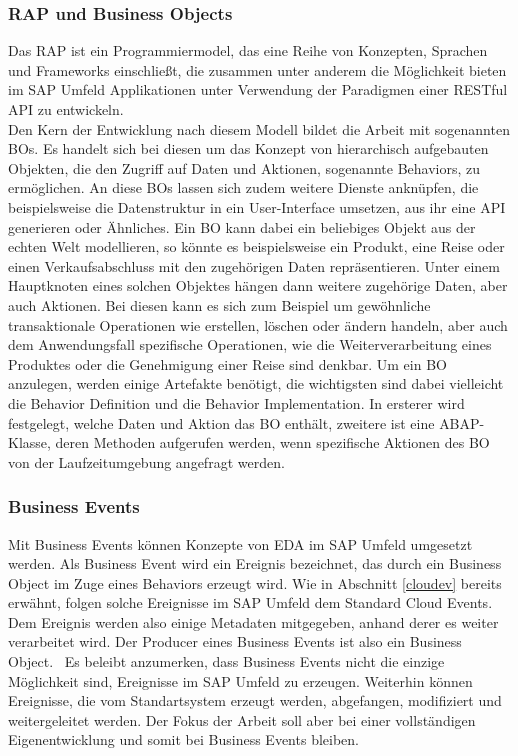 \subsubsection*{RAP und Business Objects}
Das \acl{RAP} ist ein Programmiermodel, das eine Reihe von Konzepten, Sprachen und Frameworks einschließt, die zusammen unter anderem die Möglichkeit bieten im SAP Umfeld Applikationen unter Verwendung der Paradigmen einer \ac*{REST}ful \ac{API} zu entwickeln. \cite[Vgl.][]{sapse_rap} \\
Den Kern der Entwicklung nach diesem Modell bildet die Arbeit mit sogenannten \ac{BO}s. Es handelt sich bei diesen um das Konzept von hierarchisch aufgebauten Objekten, die den Zugriff auf Daten und Aktionen, sogenannte Behaviors, zu ermöglichen. An diese \ac{BO}s lassen sich zudem weitere Dienste anknüpfen, die beispielsweise die Datenstruktur in ein User-Interface umsetzen, aus ihr eine \ac{API} generieren oder Ähnliches. Ein \ac{BO} kann dabei ein beliebiges Objekt aus der echten Welt modellieren, so könnte es beispielsweise ein Produkt, eine Reise oder einen Verkaufsabschluss mit den zugehörigen Daten repräsentieren. Unter einem Hauptknoten eines solchen Objektes hängen dann weitere zugehörige Daten, aber auch Aktionen. Bei diesen kann es sich zum Beispiel um gewöhnliche transaktionale Operationen wie erstellen, löschen oder ändern handeln, aber auch dem Anwendungsfall spezifische Operationen, wie die Weiterverarbeitung eines Produktes oder die Genehmigung einer Reise sind denkbar. Um ein \ac{BO} anzulegen, werden einige Artefakte benötigt, die wichtigsten sind dabei vielleicht die Behavior Definition und die Behavior Implementation. In ersterer wird festgelegt, welche Daten und Aktion das \ac{BO} enthält, zweitere ist eine \ac{ABAP}-Klasse, deren Methoden aufgerufen werden, wenn spezifische Aktionen des \ac{BO} von der Laufzeitumgebung angefragt werden. \cite[Vgl.][]{sapse_rap}

\subsubsection*{Business Events}
Mit Business Events können Konzepte von \ac{EDA} im SAP Umfeld umgesetzt werden. Als Business Event wird ein Ereignis bezeichnet, das durch ein Business Object im Zuge eines Behaviors erzeugt wird. Wie in Abschnitt \ref{cloudev} bereits erwähnt, folgen solche Ereignisse im SAP Umfeld dem Standard Cloud Events. Dem Ereignis werden also einige Metadaten mitgegeben, anhand derer es weiter verarbeitet wird. Der Producer eines Business Events ist also ein Business Object.\ \cite[Vgl.][]{sapse_bes} Es beleibt anzumerken, dass Business Events nicht die einzige Möglichkeit sind, Ereignisse im SAP Umfeld zu erzeugen. Weiterhin können Ereignisse, die vom Standartsystem erzeugt werden, abgefangen, modifiziert und weitergeleitet werden. Der Fokus der Arbeit soll aber bei einer vollständigen Eigenentwicklung und somit bei Business Events bleiben.

